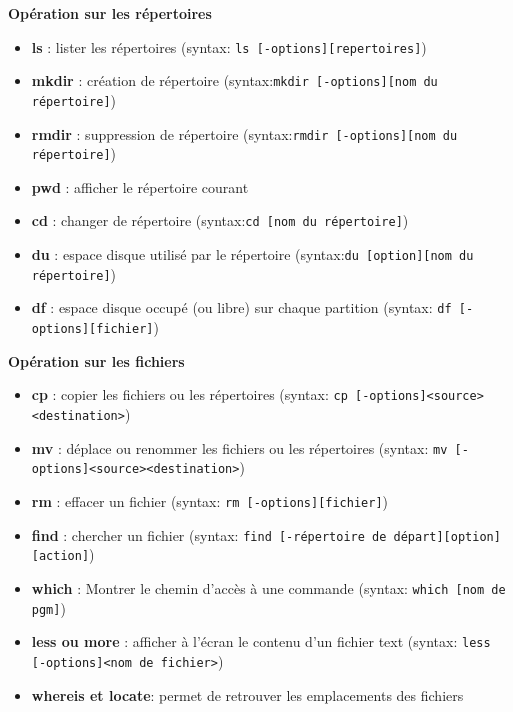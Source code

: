 \documentclass[french]{beamer}
\begin{document}
\begin{frame}
\textbf{Opération sur les répertoires}
    \begin{itemize}
    \item \textbf{ls} : lister les répertoires (syntax: \texttt{ls [-options][repertoires]})
    \item \textbf{mkdir} : création de répertoire (syntax:\texttt{mkdir [-options][nom du répertoire]})
    \item \textbf{rmdir} : suppression de répertoire (syntax:\texttt{rmdir [-options][nom du répertoire]})
    \item \textbf{pwd} : afficher le répertoire courant
    \item \textbf{cd} : changer de répertoire (syntax:\texttt{cd [nom du répertoire]})
    \item \textbf{du} : espace disque utilisé par le répertoire (syntax:\texttt{du [option][nom du répertoire]})
    \item \textbf{df} : espace disque occupé (ou libre) sur chaque partition (syntax: \texttt{df [-options][fichier]})
    \end{itemize}
\end{frame}

\begin{frame}
\textbf{Opération sur les fichiers}
    \begin{itemize}
    \item \textbf{cp} : copier les fichiers ou les répertoires (syntax: \texttt{cp [-options]<source><destination>})
    \item \textbf{mv} : déplace ou renommer les fichiers ou les répertoires (syntax: \texttt{mv [-options]<source><destination>})
    \item \textbf{rm} : effacer un fichier (syntax: \texttt{rm [-options][fichier]})
    \item \textbf{find} : chercher un fichier (syntax: \texttt{find [-répertoire de départ][option][action]})
    \item \textbf{which} : Montrer le chemin d'accès à une commande (syntax: \texttt{which [nom de pgm]})
    \item \textbf{less ou more} : afficher à l'écran le contenu d'un fichier text (syntax: \texttt{less [-options]<nom de fichier>})
    \item \textbf{whereis et locate}: permet de retrouver les emplacements des
    fichiers
    \end{itemize}
\end{frame}
\end{document}
